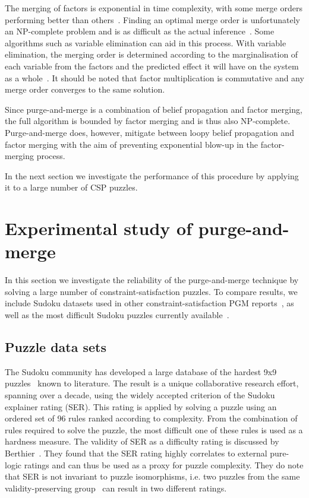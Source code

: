 \documentclass{ieeeaccess}
\begin{document}
{	The merging of factors is exponential in time complexity, with some merge orders performing better than others~\cite{koller}. Finding an optimal merge order is unfortunately an NP-complete problem and is as difficult as the actual inference~\cite{koller}. Some algorithms such as variable elimination can aid in this process. With variable elimination, the merging order is determined according to the marginalisation of each variable from the factors and the predicted effect it will have on the system as a whole~\cite{koller}. It should be noted that factor multiplication is commutative and any merge order converges to the same solution.
	
	Since purge-and-merge is a combination of belief propagation and factor merging, the full algorithm is bounded by factor merging and is thus also NP-complete. Purge-and-merge does, however, mitigate between loopy belief propagation and factor merging with the aim of preventing exponential blow-up in the factor-merging process.

	In the next section we investigate the performance of this procedure by applying it to a large number of CSP puzzles.	
	
	\section{Experimental study of purge-and-merge}\label{sec:experiments}
	In this section we investigate the reliability of the purge-and-merge technique by solving a large number of constraint-satisfaction puzzles. To compare results, we include Sudoku datasets used in other constraint-satisfaction PGM reports~\cite{MoonT, GoldbergerJ, KhanS, BaukeH, LakshmiA, streicher}, as well as the most difficult Sudoku puzzles currently available~\cite{champagne}.
	
	\subsection{Puzzle data sets}
	The Sudoku community has developed a large database of the hardest 9x9 puzzles~\cite{champagne} known to literature. The result is a unique collaborative research effort, spanning over a decade, using the widely accepted criterion of the Sudoku explainer rating (SER). This rating is applied by solving a puzzle using an ordered set of 96 rules ranked according to complexity. From the combination of rules required to solve the puzzle, the most difficult one of these rules is used as a hardness measure. The validity of SER as a difficulty rating is discussed by Berthier~\cite{csppuzzle}. They found that the SER rating highly correlates to external pure-logic ratings and can thus be used as a proxy for puzzle complexity. They do note that SER is not invariant to puzzle isomorphisms, i.e. two puzzles from the same validity-preserving group~\cite{russell2006mathematics} can result in two different ratings.
	
}
\end{document}
